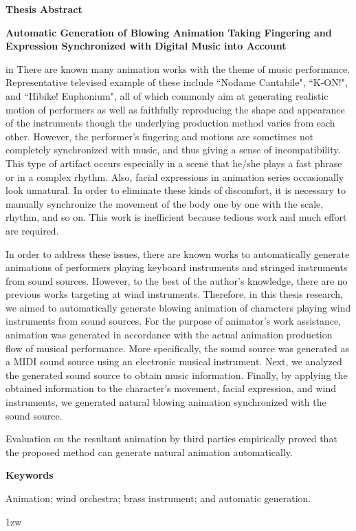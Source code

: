 \begin{center}
{\bf {\large Thesis Abstract}}

\vspace{2ex}

{\bf {\large Automatic Generation of Blowing Animation Taking Fingering and Expression Synchronized with Digital Music into Account}}
\end{center}

\vspace{3ex}

 in
There are known many animation works with the theme of music performance. Representative televised example of these include ``Nodame Cantabile", ``K-ON!", and ``Hibike! Euphonium", all of which commonly aim at generating realistic motion of performers as well as faithfully reproducing the shape and appearance of the instruments though the underlying production method varies from each other. However, the performer's fingering and motions are sometimes not completely synchronized with music, and thus giving a sense of incompatibility. This type of artifact occurs especially in a scene that he/she plays a fast phrase or in a complex rhythm. Also, facial expressions in animation series occasionally look unnatural. In order to eliminate these kinds of discomfort, it is necessary to manually synchronize the movement of the body one by one with the scale, rhythm, and so on. This work is inefficient because tedious work and much effort are required.\par
%
In order to address these issues, there are known works to automatically generate animations of performers playing keyboard instruments and stringed instruments from sound sources. However, to the best of the author's knowledge, there are no previous works targeting at wind instruments. Therefore, in this thesis research, we aimed to automatically generate blowing animation of characters playing wind instruments from sound sources. For the purpose of animator's work assistance, animation was generated in accordance with the actual animation production flow of musical performance. More specifically, the sound source was generated as a MIDI sound source using an electronic musical instrument. Next, we analyzed the generated sound source to obtain music information. Finally, by applying the obtained information to the character's movement, facial expression, and wind instruments, we generated natural blowing animation synchronized with the sound source.\par
%
Evaluation on the resultant animation by third parties empirically proved that the proposed method can generate natural animation automatically.
\vspace{4ex}

\noindent
{\bf Keywords}

\noindent
Animation; wind orchestra; brass instrument; and automatic generation.

\parindent 1zw